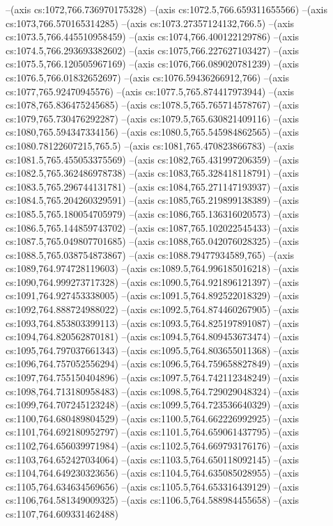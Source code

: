 --(axis cs:1072,766.736970175328)
--(axis cs:1072.5,766.659311655566)
--(axis cs:1073,766.570165314285)
--(axis cs:1073.27357124132,766.5)
--(axis cs:1073.5,766.445510958459)
--(axis cs:1074,766.400122129786)
--(axis cs:1074.5,766.293693382602)
--(axis cs:1075,766.227627103427)
--(axis cs:1075.5,766.120505967169)
--(axis cs:1076,766.089020781239)
--(axis cs:1076.5,766.01832652697)
--(axis cs:1076.59436266912,766)
--(axis cs:1077,765.92470945576)
--(axis cs:1077.5,765.874417973944)
--(axis cs:1078,765.836475245685)
--(axis cs:1078.5,765.765714578767)
--(axis cs:1079,765.730476292287)
--(axis cs:1079.5,765.630821409116)
--(axis cs:1080,765.594347334156)
--(axis cs:1080.5,765.545984862565)
--(axis cs:1080.78122607215,765.5)
--(axis cs:1081,765.470823866783)
--(axis cs:1081.5,765.455053375569)
--(axis cs:1082,765.431997206359)
--(axis cs:1082.5,765.362486978738)
--(axis cs:1083,765.328418118791)
--(axis cs:1083.5,765.296744131781)
--(axis cs:1084,765.271147193937)
--(axis cs:1084.5,765.204260329591)
--(axis cs:1085,765.219899138389)
--(axis cs:1085.5,765.180054705979)
--(axis cs:1086,765.136316020573)
--(axis cs:1086.5,765.144859743702)
--(axis cs:1087,765.102022545433)
--(axis cs:1087.5,765.049807701685)
--(axis cs:1088,765.042076028325)
--(axis cs:1088.5,765.038754873867)
--(axis cs:1088.79477934589,765)
--(axis cs:1089,764.974728119603)
--(axis cs:1089.5,764.996185016218)
--(axis cs:1090,764.999273717328)
--(axis cs:1090.5,764.921896121397)
--(axis cs:1091,764.927453338005)
--(axis cs:1091.5,764.892522018329)
--(axis cs:1092,764.888724988022)
--(axis cs:1092.5,764.874460267905)
--(axis cs:1093,764.853803399113)
--(axis cs:1093.5,764.825197891087)
--(axis cs:1094,764.820562870181)
--(axis cs:1094.5,764.809453673474)
--(axis cs:1095,764.797037661343)
--(axis cs:1095.5,764.803655011368)
--(axis cs:1096,764.757052556294)
--(axis cs:1096.5,764.759658827849)
--(axis cs:1097,764.755150404896)
--(axis cs:1097.5,764.742112348249)
--(axis cs:1098,764.713180958483)
--(axis cs:1098.5,764.729029048324)
--(axis cs:1099,764.707245123248)
--(axis cs:1099.5,764.723536640329)
--(axis cs:1100,764.680489804529)
--(axis cs:1100.5,764.662226992925)
--(axis cs:1101,764.692180952797)
--(axis cs:1101.5,764.659061437795)
--(axis cs:1102,764.656039971984)
--(axis cs:1102.5,764.669793176176)
--(axis cs:1103,764.652427034064)
--(axis cs:1103.5,764.650118092145)
--(axis cs:1104,764.649230323656)
--(axis cs:1104.5,764.635085028955)
--(axis cs:1105,764.634634569656)
--(axis cs:1105.5,764.653316439129)
--(axis cs:1106,764.581349009325)
--(axis cs:1106.5,764.588984455658)
--(axis cs:1107,764.609331462488)
